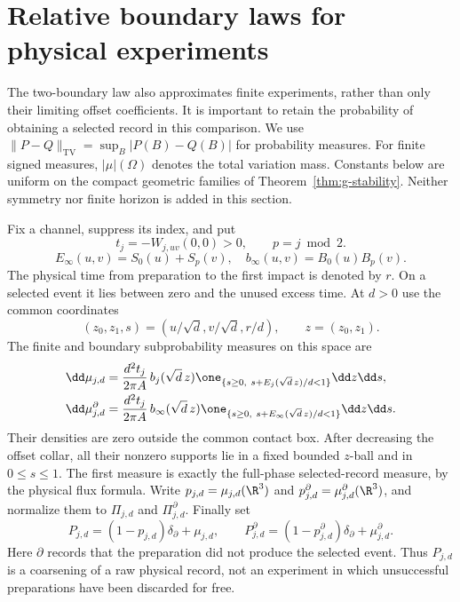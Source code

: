 \section{Relative boundary laws for physical experiments}
\label{sec:v6-transfer}
The two-boundary law also approximates finite experiments, rather than
only their limiting offset coefficients. It is important to retain the
probability of obtaining a selected record in this comparison. We use
$\|P-Q\|_{\mathrm{TV}}=\sup_B|P(B)-Q(B)|$ for probability measures.
For finite signed measures, $|\mu|(\Omega)$ denotes the total variation
mass. Constants below are uniform on the compact geometric families of
Theorem~\ref{thm:g-stability}. Neither symmetry nor finite horizon is
added in this section.

Fix a channel, suppress its index, and put
\[
 t_j=-W_{j,uv}(0,0)>0,\qquad p=j\bmod2.
\]
\[
 E_\infty(u,v)=S_0(u)+S_p(v),\quad
 b_\infty(u,v)=B_0(u)B_p(v).
\]
The physical time from preparation to the first impact is denoted by $r$.
On a selected event it lies between zero and the unused excess time.
At $d>0$ use the common coordinates
\[
 (z_0,z_1,s)=(u/\sqrt d,v/\sqrt d,r/d),\qquad z=(z_0,z_1).
\]
The finite and boundary subprobability measures on this space are
\begin{align}
 \dd\mu_{j,d}
 &=\frac{d^2t_j}{2\pi A}\,b_j(\sqrt d\,z)
   \one_{\{s\ge0,\ s+E_j(\sqrt d\,z)/d<1\}}\dd z\dd s,
       \label{eq:v6-finite-experiment}\\
 \dd\mu^\partial_{j,d}
 &=\frac{d^2t_j}{2\pi A}\,b_\infty(\sqrt d\,z)
   \one_{\{s\ge0,\ s+E_\infty(\sqrt d\,z)/d<1\}}\dd z\dd s.
       \label{eq:v6-boundary-experiment}
\end{align}
Their densities are zero outside the common contact box. After decreasing
the offset collar, all their nonzero supports lie in a fixed bounded
$z$-ball and in $0\le s\le1$. The first measure is exactly the
full-phase selected-record measure, by the physical flux formula.
Write $p_{j,d}=\mu_{j,d}(\R^3)$ and
$p^\partial_{j,d}=\mu^\partial_{j,d}(\R^3)$, and normalize them to
$\Pi_{j,d}$ and $\Pi^\partial_{j,d}$. Finally set
\[
 P_{j,d}=(1-p_{j,d})\delta_{\partial}+\mu_{j,d},\qquad
 P^\partial_{j,d}=(1-p^\partial_{j,d})\delta_{\partial}
                         +\mu^\partial_{j,d}.
\]
Here $\partial$ records that the preparation did not produce the selected
event. Thus $P_{j,d}$ is a coarsening of a raw physical record, not an
experiment in which unsuccessful preparations have been discarded for free.

